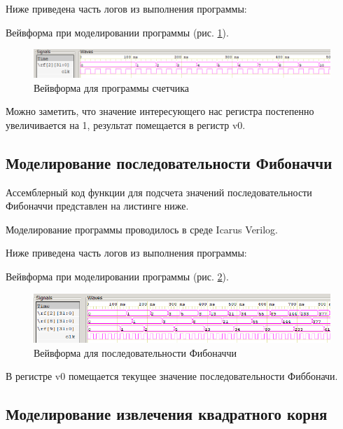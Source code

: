 \documentclass[a4paper,14pt]{article}
\begin{document}
	Ниже приведена часть логов из выполнения программы:
	
	{\small {}}
	
	Вейвформа при моделировании программы (рис. \ref{fig:00wvf}).
	
	\begin{figure}[H]
		\centering
		\includegraphics[width=0.95\linewidth]{images/00_wvf}
		\caption{Вейвформа для программы счетчика}
		\label{fig:00wvf}
	\end{figure}

	Можно заметить, что значение интересующего нас регистра постепенно увеличивается на 1, результат помещается в регистр v0.
	
	
	\subsection{Моделирование последовательности Фибоначчи}
	
	Ассемблерный код функции для подсчета значений последовательности Фибоначчи представлен на листинге ниже.
	
	{\small {}}
	
	Моделирование программы проводилось в среде Icarus Verilog.
	
	Ниже приведена часть логов из выполнения программы:
	
	{\small {}}
	
	Вейвформа при моделировании программы (рис. \ref{fig:01wvf}).
	
	\begin{figure}[H]
		\centering
		\includegraphics[width=0.95\linewidth]{images/01_wvf}
		\caption{Вейвформа для последовательности Фибоначчи}
		\label{fig:01wvf}
	\end{figure}

	В регистре v0 помещается текущее значение последовательности Фиббоначи.
	

	\subsection{Моделирование извлечения квадратного корня}
	
\end{document}
